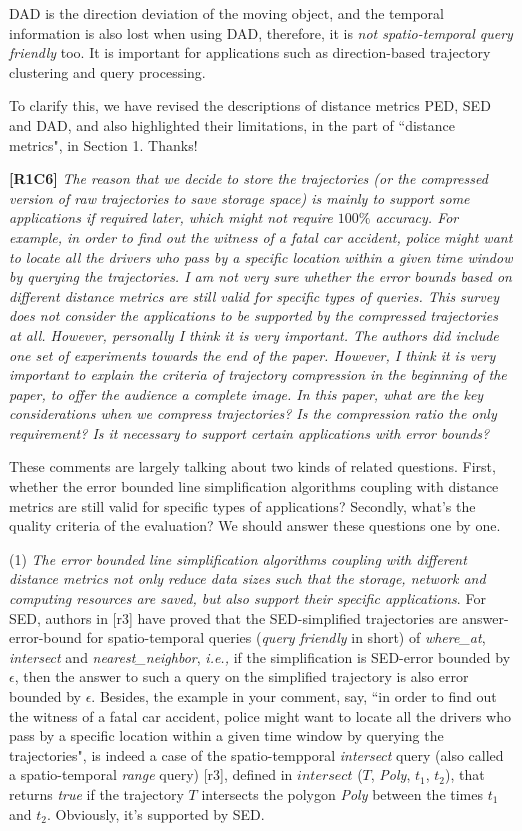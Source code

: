 \documentclass{letter}
\newcommand{\ie}{\emph{i.e.,}\xspace}
\begin{document}
{DAD is the direction deviation of the moving object, and 
the temporal information is also lost when using DAD, therefore, it is \emph{not spatio-temporal query friendly} too. It is important for applications such as direction-based trajectory clustering and query processing.

To clarify this, we have revised the descriptions of distance metrics PED, SED and DAD, and also highlighted their limitations, in the part of ``distance metrics", in Section 1. Thanks!

\textbf{[R1C6]} \emph{ The reason that we decide to store the trajectories (or the compressed version of raw trajectories to save storage space) is mainly to support some applications if required later, which might not require $100\%$ accuracy. For example, in order to find out the witness of a fatal car accident, police might want to locate all the drivers who pass by a specific location within a given time window by querying the trajectories. I am not very sure whether the error bounds based on different distance metrics are still valid for specific types of queries. {This survey does not consider the applications to be supported by the compressed trajectories at all. However, personally I think it is very important.} The authors did include one set of experiments towards the end of the paper. However, I think it is very important to explain the criteria of trajectory compression in the beginning of the paper, to offer the audience a complete image. In this paper, what are the key considerations when we compress trajectories? Is the compression ratio the only requirement? Is it necessary to support certain applications with error bounds? }


These comments are largely talking about two kinds of related questions. First, whether the error bounded line simplification algorithms coupling with distance metrics are still valid for specific types of applications? Secondly, what's the quality criteria of the evaluation? We should answer these questions one by one.

(1) \emph{The error bounded line simplification algorithms coupling with different distance metrics not only reduce data sizes such that the storage, network and computing resources are saved, but also support their specific applications}. For SED, authors in [r3] have proved that the SED-simplified trajectories are answer-error-bound for spatio-temporal queries (\emph{query friendly} in short) of \emph{where\_at}, \emph{intersect} and \emph{nearest\_neighbor}, \ie if the simplification is SED-error bounded by $\epsilon$, then the answer to such a query on the simplified trajectory is also error bounded by $\epsilon$.
Besides, the example in your comment, say, ``in order to find out the witness of a fatal car accident, police might want to locate all the drivers who pass by a specific location within a given time window by querying the trajectories", is indeed a case of the spatio-tempporal \emph{intersect} query (also called a spatio-temporal \emph{range} query) [r3], defined in $intersect$ ($T$, \emph{Poly}, $t_1$, $t_2$), that returns \emph{true} if the trajectory $T$ intersects the polygon \emph{Poly} between the times $t_1$ and $t_2$. Obviously, it's supported by SED.

}
\end{document}
